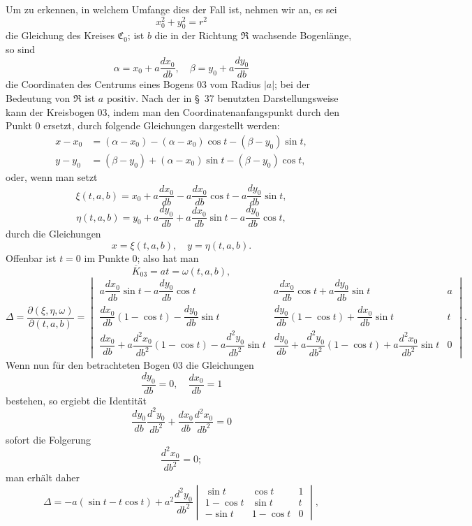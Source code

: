 \documentclass[11pt,a4paper,leqno]{article}
\begin{document}
Um zu erkennen, in welchem Umfange dies der Fall ist, nehmen wir an, es sei
\[
x_0^2+y_0^2=r^2
\]
die Gleichung des Kreises $\mathfrak{C}_0$; ist $b$ die in der Richtung $\mathfrak{R}$ wachsende Bogenlänge, so sind
\[
\alpha=x_0+a\frac{dx_0}{db},\quad \beta=y_0+a\frac{dy_0}{db}
\]
die Coordinaten des Centrums eines Bogens 03 vom Radius $|a|$; bei der Bedeutung von $\mathfrak{R}$ ist $a$ positiv. Nach der in \S~37 benutzten Darstellungsweise kann der Kreisbogen 03, indem man den Coordinatenanfangspunkt durch den Punkt 0 ersetzt, durch folgende Gleichungen dargestellt werden:
\[
\begin{aligned}
x-x_0&=(\alpha-x_0)-(\alpha-x_0)\cos t-(\beta-y_0)\sin t,\\
y-y_0&=(\beta-y_0)+(\alpha-x_0)\sin t-(\beta-y_0)\cos t,
\end{aligned}
\]
oder, wenn man setzt
\[
\xi(t,a,b)=x_0+a\frac{dx_0}{db}-a\frac{dx_0}{db}\cos t-a\frac{dy_0}{db}\sin t,
\]
\[
\eta(t,a,b)=y_0+a\frac{dy_0}{db}+a\frac{dx_0}{db}\sin t-a\frac{dy_0}{db}\cos t,
\]
durch die Gleichungen
\[
x=\xi(t,a,b),\quad y=\eta(t,a,b).
\]
Offenbar ist $t=0$ im Punkte 0; also hat man
\[
\overline{K}_{03}=at=\omega(t,a,b),
\]
\begingroup
\setlength{\arraycolsep}{1pt}
\[
\Delta=\frac{\partial(\xi,\eta,\omega)}{\partial(t,a,b)}=
\begin{vmatrix}
 a\dfrac{dx_0}{db}\sin t-a\dfrac{dy_0}{db}\cos t & a\dfrac{dx_0}{db}\cos t+a\dfrac{dy_0}{db}\sin t & a\\[1.0ex]
 \dfrac{dx_0}{db}(1-\cos t)-\dfrac{dy_0}{db}\sin t & \dfrac{dy_0}{db}(1-\cos t)+\dfrac{dx_0}{db}\sin t & t\\[1.0ex]
 \dfrac{dx_0}{db}+a\dfrac{d^2x_0}{db^2}(1-\cos t)-a\dfrac{d^2y_0}{db^2}\sin t & \dfrac{dy_0}{db}+a\dfrac{d^2y_0}{db^2}(1-\cos t)+a\dfrac{d^2x_0}{db^2}\sin t & 0
\end{vmatrix}.
\]
\endgroup
Wenn nun für den betrachteten Bogen 03 die Gleichungen
\begin{equation}\tag{30}
\frac{dy_0}{db}=0,\quad \frac{dx_0}{db}=1
\end{equation}
bestehen, so ergiebt die Identität
\[
\frac{dy_0}{db}\frac{d^2y_0}{db^2}+\frac{dx_0}{db}\frac{d^2x_0}{db^2}=0
\]
sofort die Folgerung
\[
\frac{d^2x_0}{db^2}=0;
\]
man erhält daher
\[
\Delta=-a(\sin t-t\cos t)+a^2\frac{d^2y_0}{db^2}\begin{vmatrix}
\sin t&\cos t&1\\
1-\cos t&\sin t&t\\
-\sin t&1-\cos t&0
\end{vmatrix},
\]
\end{document}
